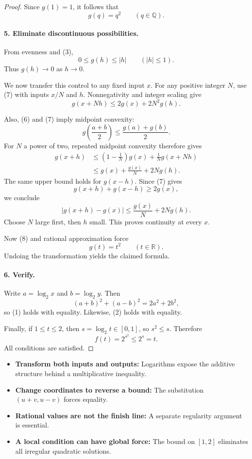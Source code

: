 \begin{dlsummary}[title={\bfseries Solution 60. The Squared-Logarithm Trap},breakable]
\begin{proof}
Since \(g(1)=1\), it follows that
\[
\boxed{g(q)=q^2\qquad(q\in\mathbb Q).} \tag{8}
\]

\paragraph{5. Eliminate discontinuous possibilities.}

From evenness and (3),
\[
0\le g(h)\le |h|\qquad(|h|\le1).
\]
Thus \(g(h)\to0\) as \(h\to0\).

We now transfer this control to any fixed input \(x\). For any positive integer \(N\), use (7) with inputs \(x/N\) and \(h\). Nonnegativity and integer scaling give
\[
g(x+Nh)\le2g(x)+2N^2g(h).
\]

Also, (6) and (7) imply midpoint convexity:
\[
g\!\left(\frac{a+b}{2}\right)
\le\frac{g(a)+g(b)}2.
\]
For \(N\) a power of two, repeated midpoint convexity therefore gives
\[
\begin{aligned}
g(x+h)
&\le\left(1-\frac1N\right)g(x)
+\frac1N g(x+Nh)\\
&\le g(x)+\frac{g(x)}N+2Ng(h).
\end{aligned}
\]
The same upper bound holds for \(g(x-h)\). Since (7) gives
\[
g(x+h)+g(x-h)\ge2g(x),
\]
we conclude
\[
|g(x+h)-g(x)|
\le\frac{g(x)}N+2Ng(h).
\]
Choose \(N\) large first, then \(h\) small. This proves continuity at every \(x\).

Now (8) and rational approximation force
\[
g(t)=t^2\qquad(t\in\mathbb R).
\]
Undoing the transformation yields the claimed formula.

\paragraph{6. Verify.}

Write \(a=\log_2 x\) and \(b=\log_2 y\). Then
\[
(a+b)^2+(a-b)^2=2a^2+2b^2,
\]
so (1) holds with equality. Likewise, (2) holds with equality.

Finally, if \(1\le t\le2\), then \(s=\log_2t\in[0,1]\), so \(s^2\le s\). Therefore
\[
f(t)=2^{s^2}\le2^s=t.
\]
All conditions are satisfied.
\end{proof}
\end{dlsummary}

\begin{takeaways}
\begin{itemize}
\item \textbf{Transform both inputs and outputs:} Logarithms expose the additive structure behind a multiplicative inequality.
\item \textbf{Change coordinates to reverse a bound:} The substitution \((u+v,u-v)\) forces equality.
\item \textbf{Rational values are not the finish line:} A separate regularity argument is essential.
\item \textbf{A local condition can have global force:} The bound on \([1,2]\) eliminates all irregular quadratic solutions.
\end{itemize}
\end{takeaways}
